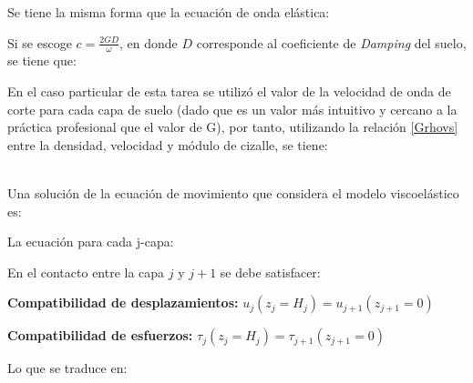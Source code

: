 
Se tiene la misma forma que la ecuación de onda elástica:


Si se escoge $c = \frac{2GD}{\omega}$, en donde $D$ corresponde al coeficiente de \textit{Damping} del suelo, se tiene que:


En el caso particular de esta tarea se utilizó el valor de la velocidad de onda de corte para cada capa de suelo (dado que es un valor más intuitivo y cercano a la práctica profesional que el valor de G), por tanto, utilizando la relación \eqref{Grhovs} entre la densidad, velocidad y módulo de cizalle, se tiene:


 \\

Una solución de la ecuación de movimiento que considera el modelo viscoelástico es:


La ecuación para cada j-capa:


En el contacto entre la capa $j$ y $j+1$ se debe satisfacer:

\begin{enumeratebf}
	\item \textbf{Compatibilidad de desplazamientos:} $u_j(z_j=H_j) = u_{j+1}(z_{j+1}=0)$
	\item \textbf{Compatibilidad de esfuerzos:} $\tau_j(z_j=H_j) = \tau_{j+1}(z_{j+1}=0)$
\end{enumeratebf}

Lo que se traduce en:

